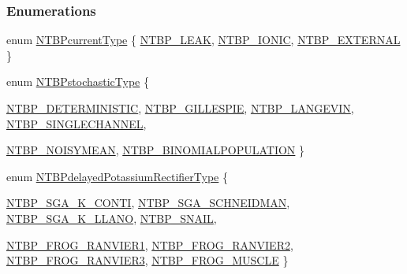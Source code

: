 \subsubsection*{Enumerations}
\begin{DoxyCompactItemize}
\item 
enum \hyperlink{ntbp__object__obj_8h_a08c09fa5122ac3042638b8a9ada622d0}{NTBPcurrentType} \{ \hyperlink{ntbp__object__obj_8h_a08c09fa5122ac3042638b8a9ada622d0a455e81a6cb8d1f15075ae54315681bb7}{NTBP\_\-LEAK}, 
\hyperlink{ntbp__object__obj_8h_a08c09fa5122ac3042638b8a9ada622d0a332541ebc16184d7d9e1730b9463a181}{NTBP\_\-IONIC}, 
\hyperlink{ntbp__object__obj_8h_a08c09fa5122ac3042638b8a9ada622d0af04faa903b9a5f638eaaf5b50b82cd44}{NTBP\_\-EXTERNAL}
 \}
\item 
enum \hyperlink{ntbp__object__obj_8h_a9983412df2da7c7ecc65cd066e73b345}{NTBPstochasticType} \{ \par
\hyperlink{ntbp__object__obj_8h_a9983412df2da7c7ecc65cd066e73b345a7c165b2401d57cb214dcec079be4a646}{NTBP\_\-DETERMINISTIC}, 
\hyperlink{ntbp__object__obj_8h_a9983412df2da7c7ecc65cd066e73b345a7da3e4777e9e3245c83720dba32c6ba9}{NTBP\_\-GILLESPIE}, 
\hyperlink{ntbp__object__obj_8h_a9983412df2da7c7ecc65cd066e73b345a585becebbae7e6e2af6d1288055a22fc}{NTBP\_\-LANGEVIN}, 
\hyperlink{ntbp__object__obj_8h_a9983412df2da7c7ecc65cd066e73b345a409c0f2b3bc5cd419a7326aa87fe1dae}{NTBP\_\-SINGLECHANNEL}, 
\par
\hyperlink{ntbp__object__obj_8h_a9983412df2da7c7ecc65cd066e73b345a3a2c3a86db0ccbb8591a623bd71e82e0}{NTBP\_\-NOISYMEAN}, 
\hyperlink{ntbp__object__obj_8h_a9983412df2da7c7ecc65cd066e73b345a557545ef99b5950db6d48fc318af8661}{NTBP\_\-BINOMIALPOPULATION}
 \}
\item 
enum \hyperlink{ntbp__object__obj_8h_aeeceaef81d00b84a44823ba078e4fcd3}{NTBPdelayedPotassiumRectifierType} \{ \par
\hyperlink{ntbp__object__obj_8h_aeeceaef81d00b84a44823ba078e4fcd3a5299833bee4ceabddce2ec831b464a31}{NTBP\_\-SGA\_\-K\_\-CONTI}, 
\hyperlink{ntbp__object__obj_8h_aeeceaef81d00b84a44823ba078e4fcd3ab252ef353b6c508a60e2d49a32ae8f71}{NTBP\_\-SGA\_\-SCHNEIDMAN}, 
\hyperlink{ntbp__object__obj_8h_aeeceaef81d00b84a44823ba078e4fcd3a63633021d36bc55145ab3ec03d24266a}{NTBP\_\-SGA\_\-K\_\-LLANO}, 
\hyperlink{ntbp__object__obj_8h_aeeceaef81d00b84a44823ba078e4fcd3a50d72f4a46cf10f7deca90d35ee1575f}{NTBP\_\-SNAIL}, 
\par
\hyperlink{ntbp__object__obj_8h_aeeceaef81d00b84a44823ba078e4fcd3a5b9e3b1ee808f46196206b9a9a0ac99c}{NTBP\_\-FROG\_\-RANVIER1}, 
\hyperlink{ntbp__object__obj_8h_aeeceaef81d00b84a44823ba078e4fcd3ab0e551ccab8ffdff209d0e122eb860e7}{NTBP\_\-FROG\_\-RANVIER2}, 
\hyperlink{ntbp__object__obj_8h_aeeceaef81d00b84a44823ba078e4fcd3a044561c68c787086a371e09dca45fa91}{NTBP\_\-FROG\_\-RANVIER3}, 
\hyperlink{ntbp__object__obj_8h_aeeceaef81d00b84a44823ba078e4fcd3aa36513b56d8a9cfb3e48af369ba8dbfe}{NTBP\_\-FROG\_\-MUSCLE}
 \}
\end{DoxyCompactItemize}
